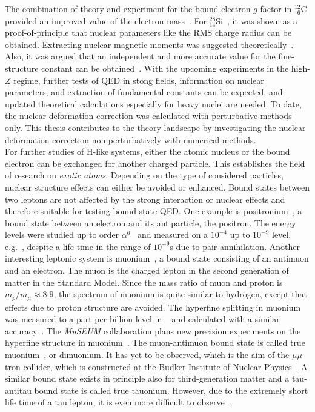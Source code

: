 The combination of theory and experiment for the bound electron $g$ factor in $^{12}_{\phantom{0}6}$C provided an improved value of the electron mass~\cite{Sturm2014,Zatorski2017}. For $^{28}_{14}$Si~\cite{Sturm2011}, it was shown as a proof-of-principle that nuclear parameters like the RMS charge radius can be obtained. Extracting nuclear magnetic moments was suggested theoretically~\cite{Yerokhin2011,Werth2001}. Also, it was argued that an independent and more accurate value for the fine-structure constant can be obtained~\cite{Shabaev2006,yerokhin2016}. With the upcoming experiments in the high-$Z$ regime, further tests of QED in stong fields, information on nuclear parameters, and extraction of fundamental constants can be expected, and updated theoretical calculations especially for heavy nuclei are needed. To date, the nuclear deformation correction was calculated with perturbative methods only. This thesis contributes to the theory landscape by investigating the nuclear deformation correction non-perturbatively with numerical methods.\\[11pt]
For further studies of H-like systems, either the atomic nucleus or the bound electron can be exchanged for another charged particle. This establishes the field of research on \textit{exotic atoms}. Depending on the type of considered particles, nuclear structure effects can either be avoided or enhanced. Bound states between two leptons are not affected by the strong interaction or nuclear effects and therefore suitable for testing bound state QED. 
One example is positronium~\cite{karshenboim2004}, a bound state between an electron and its antiparticle, the positron. The energy levels were studied up to order $\alpha^6$~\cite{pineda1998,pachucki1998,czarnecki1999,zatorski2008} and measured on a $10^{-4}$ up to $10^{-9}$ level, e.g.~\cite{mills1975,ritter1984,danzmann1989,hagena1993,fee1993}, despite a life time in the range of $10^{-9}$s due to pair annihilation. 
Another interesting leptonic system is muonium~\cite{jungmann2004}, a bound state consisting of an antimuon and an electron. The muon is the charged lepton in the second generation of matter in the Standard Model. Since the mass ratio of muon and proton is $m_p/m_\mu \approx 8.9$, the spectrum of muonium is quite similar to hydrogen, except that effects due to proton structure are avoided. The hyperfine splitting in muonium was measured to a part-per-billion level in ~\cite{casperson1975,liu1999} and calculated with a similar accuracy~\cite{pachucki1996,Karshenboim1996,sapirstein1997,nio1997,eides1998}. The \textit{MuSEUM} collaboration plans new precision experiments on the hyperfine structure in muonium~\cite{museum}. 
The muon-antimuon bound state is called true muonium~\cite{brodsky2009}, or dimuonium. It has yet to be observed, which is the aim of the $\mu\mu$tron collider, which is constructed at the Budker Institute of Nuclear Physics~\cite{bogomyagkov2017}. 
A similar bound state exists in principle also for third-generation matter and a tau-antitau bound state is called true tauonium. However, due to the extremely short life time of a tau lepton, it is even more difficult to observe~\cite{brodsky2009}.


